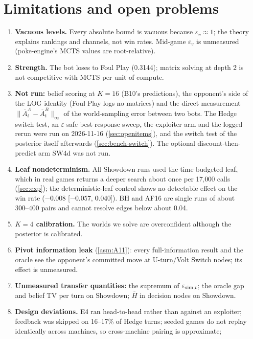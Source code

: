 \documentclass[10pt]{article}
\theoremstyle{plain}
\theoremstyle{definition}
\theoremstyle{remark}
\newcommand{\epsv}{\varepsilon_v}
\newcommand{\Hbar}{\bar H}
\begin{document}
\section{Limitations and open problems}\label{sec:limits}

\begin{enumerate}
\item \textbf{Vacuous levels.} Every absolute bound is vacuous because $\epsv\approx1$; the theory explains rankings
and channels, not win rates. Mid-game $\epsv$ is unmeasured (poke-engine's MCTS values are root-relative).
\item \textbf{Strength.} The bot loses to Foul Play (0.3144); matrix solving at depth 2 is not competitive with
MCTS per unit of compute.
\item \textbf{Not run:} belief scoring at $K=16$ (B10's predictions), the opponent's side of the LOG identity (Foul Play
logs no matrices) and the direct measurement
$\|\bar A^A_t-\bar A^B_t\|_\infty$ of the world-sampling error between two bots. The Hedge switch test, an $\varepsilon$-safe best-response sweep,
the exploiter arm and the logged rerun were run on 2026-11-16 (\cref{sec:openitems}), and the switch test of the posterior
itself afterwards (\cref{sec:bench-switch}). The optional discount-then-predict arm SW4d was not run.
\item \textbf{Leaf nondeterminism.} All Showdown runs used the time-budgeted leaf, which in real games returns a deeper
search about once per 17,000 calls (\cref{sec:exp}); the deterministic-leaf control shows no detectable effect on the win rate ($-0.008$ [$-0.057$, 0.040]). BH and AF16 are single runs of about 300--400 pairs and cannot resolve edges below
about 0.04.
\item \textbf{$K=4$ calibration.} The worlds we solve are overconfident although the posterior is calibrated.
\item \textbf{Pivot information leak} (\cref{asm:A11}): every full-information result and the oracle see the
opponent's committed move at U-turn/Volt Switch nodes; its effect is unmeasured.
\item \textbf{Unmeasured transfer quantities:} the supremum of $\varepsilon_{{\rm sim},t}$; the oracle gap and belief TV
per turn on Showdown; $\Hbar$ in decision nodes on Showdown.
\item \textbf{Design deviations.} E4 ran head-to-head rather than against an exploiter; feedback was skipped on 16--17\%
of Hedge turns; seeded games do not replay identically across machines, so cross-machine pairing is approximate;

\end{enumerate}
\end{document}

